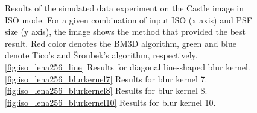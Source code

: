 \documentclass[12pt,notitlepage]{report}
\begin{document}
\begin{figure}[htb]
  \caption[Results for the castle image in ISO mode]{Results of the simulated data experiment on the Castle image in ISO mode. For a given combination of input ISO (x axis) and PSF size (y axis), the image shows the method that provided the best result. Red color denotes the BM3D algorithm, green and blue denote Tico's and Šroubek's algorithm, respectively. \ref{fig:iso_lena256_line} Results for diagonal line-shaped blur kernel. \ref{fig:iso_lena256_blurkernel7} Results for blur kernel 7. \ref{fig:iso_lena256_blurkernel8} Results for blur kernel 8. \ref{fig:iso_lena256_blurkernel10} Results for blur kernel 10.}
  \label{fig:iso_castle256}
\end{figure}

\clearpage
\end{document}
